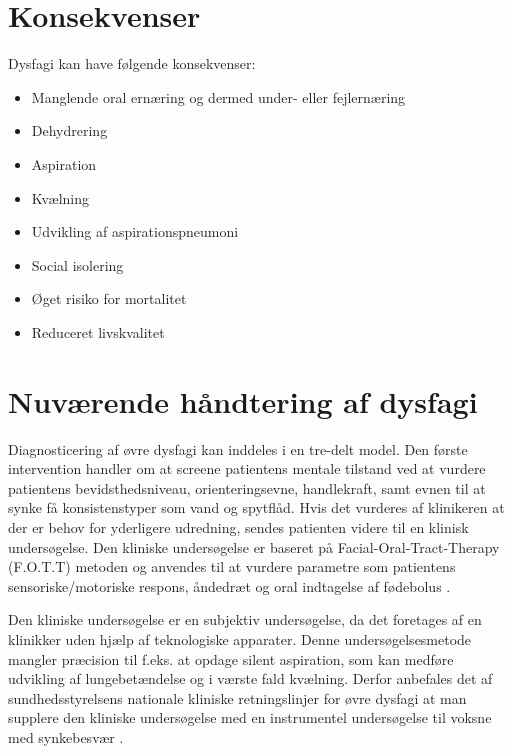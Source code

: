 \documentclass[main.tex]{subfiles}
\begin{document}
\section*{Konsekvenser}
Dysfagi kan have følgende konsekvenser\cite[s. 12]{KjaersgaardPh.d.studerendeDYSFAGIKonsekvenser}:
\begin{itemize}
\item Manglende oral ernæring og dermed under- eller fejlernæring
\item Dehydrering
\item Aspiration
\item Kvælning
\item Udvikling af aspirationspneumoni
\item Social isolering
\item Øget risiko for mortalitet
\item Reduceret livskvalitet

\end{itemize}



\section*{Nuværende håndtering af dysfagi}


Diagnosticering af øvre dysfagi kan inddeles i en tre-delt model. Den første intervention handler om at screene patientens mentale tilstand ved at vurdere patientens bevidsthedsniveau, orienteringsevne, handlekraft, samt evnen til at synke få konsistenstyper som vand og spytflåd. Hvis det vurderes af klinikeren at der er behov for yderligere udredning, sendes patienten videre til en klinisk undersøgelse. Den kliniske undersøgelse er baseret på Facial-Oral-Tract-Therapy (F.O.T.T) metoden og anvendes til at vurdere parametre som patientens sensoriske/motoriske respons, åndedræt og oral indtagelse af fødebolus \cite[s. 23-25]{Kjaersgaard2013DifficultiesPerspective}. 

Den kliniske undersøgelse er en subjektiv undersøgelse, da det foretages af en klinikker uden hjælp af teknologiske apparater. Denne undersøgelsesmetode mangler præcision til f.eks. at opdage silent aspiration, som kan medføre udvikling af lungebetændelse og i værste fald kvælning. Derfor anbefales det af sundhedsstyrelsens nationale kliniske retningslinjer for øvre dysfagi at man supplere den kliniske undersøgelse med en instrumentel undersøgelse til voksne med synkebesvær \cite{Sundhedsstyrelsen2015NationalDysfagi}.
\end{document}
